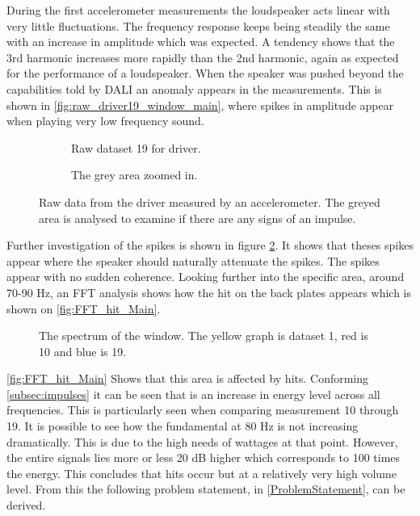 During the first accelerometer measurements the loudspeaker acts linear with very little fluctuations. The frequency response keeps being steadily the same with an increase in amplitude which was expected. A tendency shows that the 3rd harmonic increases more rapidly than the 2nd harmonic, again as expected for the performance of a loudspeaker. When the speaker was pushed beyond the capabilities told by DALI an anomaly appears in the measurements. This is shown in \autoref{fig:raw_driver19_window_main}, where spikes in amplitude appear when playing very low frequency sound. 

\begin{figure}[H]
\centering
\begin{subfigure}[t]{0.55\textwidth}
	
	\caption{Raw dataset 19 for driver.}
	\label{fig:raw_driver19_window_main}
\end{subfigure}
\begin{subfigure}[t]{0.43\textwidth}
	
	\caption{The grey area zoomed in.}
	\label{fig:raw_driver19_window_zoom_main}
\end{subfigure}
\caption{Raw data from the driver measured by an accelerometer. The greyed area is analysed to examine if there are any signs of an impulse.}
\label{fig:raw_driver19_windows_main}
\end{figure}

Further investigation of the spikes is shown in figure \ref{fig:raw_driver19_window_zoom_main}. It shows that theses spikes appear where the speaker should naturally attenuate the spikes. The spikes appear with no sudden coherence. Looking further into the specific area, around 70-90 Hz, an FFT analysis shows how the hit on the back plates appears which is shown on \autoref{fig:FFT_hit_Main}.

\begin{figure}[H]
\centering
{}

\caption{The spectrum of the window. The yellow graph is dataset 1, red is 10 and blue is 19.}
\label{fig:FFT_hit_Main}
\end{figure}

\autoref{fig:FFT_hit_Main} Shows that this area is affected by hits. Conforming \autoref{subsec:impulses} it can be seen that is an increase in energy level across all frequencies. This is particularly seen when comparing measurement 10 through 19. It is possible to see how the fundamental at 80 Hz is not increasing dramatically. This is due to the high needs of wattages at that point. However, the entire signals lies more or less 20 dB higher which corresponds to 100 times the energy. This concludes that hits occur but at a relatively very high volume level. From this the following problem statement, in \autoref{ProblemStatement}, can be derived.




